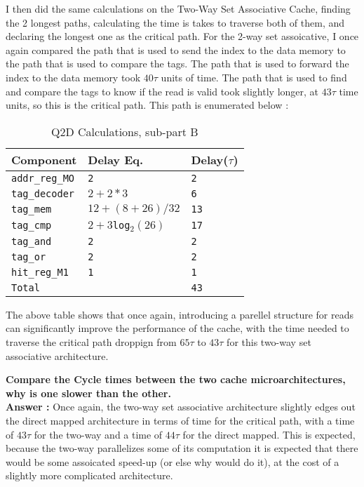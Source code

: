 \documentclass[a4paper,11pt]{article}
\newcommand{\answer}{\textbf{Answer : }}
\newcommand{\T}{\texttt}
\newcommand{\V}{\verb}
\begin{document}
I then did the same calculations on the Two-Way Set Associative Cache, finding the 2 longest paths, calculating the time is takes to traverse both of them, and declaring the longest one as the critical path. For the 2-way set assoicative, I once again compared the path that is used to send the index to the data memory to the path that is used to compare the tags. The path that is used to forward the index to the data memory took $40\tau$ units of time. The path that is used to find and compare the tags to know if the read is valid took slightly longer, at $43\tau$ time units, so this is the critical path. This path is enumerated below :


\begin{table}[H]
\caption{Q2D Calculations, sub-part B} \label{tab:q2Btable2} 
\begin{center}
\begin{tabular}{| l | l | l |}
\hline
  Component         &  Delay Eq.              & Delay($\tau$)          \\ \hline
  \V.addr_reg_MO.   &   \T{2}                 & \T{2}                  \\ \hline
  \V.tag_decoder.   &   \T{$2+2*3$}           & \T{6}                  \\ \hline
  \V.tag_mem.       &   \T{$12+(8+26)/32$}    & \T{13}                 \\ \hline
  \V.tag_cmp.       &   \T{$2+3$log$_2(26)$}  & \T{17}                 \\ \hline
  \V.tag_and.       &   \T{2}                 & \T{2}                  \\ \hline
  \V.tag_or.        &   \T{2}                 & \T{2}                  \\ \hline
  \V.hit_reg_M1.    &   \T{1}                 & \T{1}                  \\ \hline
  \V.Total.         &   \T{}                  & \T{43}                 \\ \hline
\end{tabular}
\end{center}
\end{table}

The above table shows that once again, introducing a parellel structure for reads can significantly improve the performance of the cache, with the time needed to traverse the critical path droppign from $65\tau$ to $43\tau$ for this two-way set associative architecture.

\textbf{Compare the Cycle times between the two cache microarchitectures, why is one slower than the other.} \\
\answer Once again, the two-way set associative architecture slightly edges out the direct mapped architecture in terms of time for the critical path, with a time of $43\tau$ for the two-way and a time of $44\tau$ for the direct mapped. This is expected, because the two-way parallelizes some of its computation it is expected that there would be some assoicated speed-up (or else why would do it), at the cost of a slightly more complicated architecture. 
\end{document}
